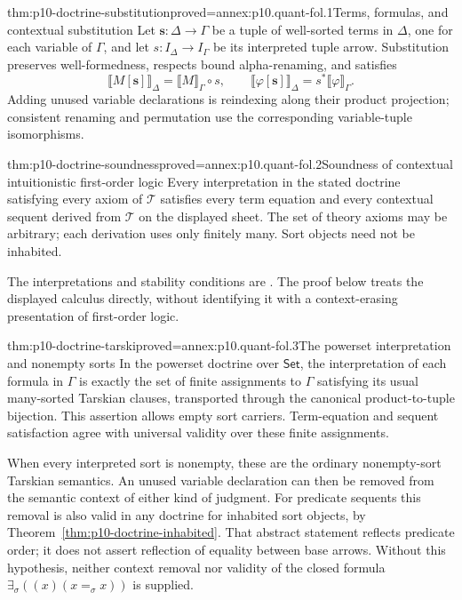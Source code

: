 \begin{hbtheorem}{thm:p10-doctrine-substitution}{proved=annex:p10.quant-fol.1}{Terms, formulas, and contextual substitution}
Let \(\mathbf s:\Delta\to\Gamma\) be a tuple of well-sorted terms
in \(\Delta\), one for each variable of \(\Gamma\), and let
\(s:I_\Delta\to I_\Gamma\) be its interpreted tuple arrow.
Substitution preserves well-formedness, respects bound alpha-renaming,
and satisfies
\[
 \llbracket M[\mathbf s]\rrbracket_\Delta
       =\llbracket M\rrbracket_\Gamma\circ s,\qquad
 \llbracket\varphi[\mathbf s]\rrbracket_\Delta
       =s^*\llbracket\varphi\rrbracket_\Gamma.
\]
Adding unused variable declarations is reindexing along their product
projection; consistent renaming and permutation use the corresponding
variable-tuple isomorphisms.
\end{hbtheorem}

\begin{hbtheorem}{thm:p10-doctrine-soundness}{proved=annex:p10.quant-fol.2}{Soundness of contextual intuitionistic first-order logic}
Every interpretation in the stated doctrine satisfying every axiom of
\(\mathcal T\) satisfies every term equation and every contextual
sequent derived from \(\mathcal T\) on the displayed sheet.
The set of theory axioms may be arbitrary; each derivation uses only
finitely many. Sort objects need not be inhabited.
\end{hbtheorem}

The interpretations and stability conditions are
\cite[\S\S5.2--5.6, pp.~40--59, especially Lemma~5.2.6,
Theorems~5.3.2 and~5.4.2]{Pitts1995Draft}.
The proof below treats the displayed calculus directly, without
identifying it with a context-erasing presentation of first-order logic.

\begin{hbtheorem}{thm:p10-doctrine-tarski}{proved=annex:p10.quant-fol.3}{The powerset interpretation and nonempty sorts}
In the powerset doctrine over \(\mathsf{Set}\), the interpretation of
each formula in \(\Gamma\) is exactly the set of finite assignments
to \(\Gamma\) satisfying its usual many-sorted Tarskian clauses,
transported through the canonical product-to-tuple bijection.
This assertion allows empty sort carriers.
Term-equation and sequent satisfaction agree with universal validity
over these finite assignments.

When every interpreted sort is nonempty, these are the ordinary
nonempty-sort Tarskian semantics. An unused variable declaration can
then be removed from the semantic context of either kind of judgment.
For predicate sequents this removal is also valid in any doctrine
for inhabited sort objects, by Theorem~\ref{thm:p10-doctrine-inhabited}.
That abstract statement reflects predicate order; it does not assert
reflection of equality between base arrows.
Without this hypothesis, neither context removal nor validity of
the closed formula \(\exists_\sigma((x)(x=_\sigma x))\) is supplied.
\end{hbtheorem}

